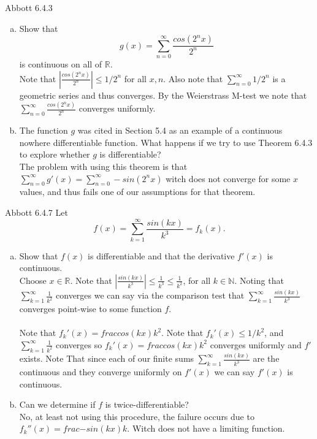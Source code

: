 \documentclass[12pt]{article}
\makeatletter
\theoremstyle{homework}
\newenvironment{exercise}[1]
{\def\@currentlabel{#1}\exercisecore}
{\endexercisecore}
\newcommand{\Reals}{\ensuremath{\mathbb R}}
\let\RR\Reals
\makeatother
\begin{document}
\begin{exercise}
3
Abbott 6.4.3
\end{exercise}
\begin{enumerate}[(a)]
\item
Show that $$g(x) = \sum_{n=0}^\infty \frac{cos(2^n x)}{2^n}$$ is continuous on all of $\RR$.\\
Note that $|\frac{cos(2^n x)}{2^n}|\leq 1/2^n$ for all $x,n$.  Also note that $\sum_{n=0}^\infty 1/2^n$ is a geometric series and thus converges.  By the Weierstrass M-test we note that $\sum_{n=0}^\infty \frac{cos(2^n x)}{2^n}$ converges uniformly.
\item
The function $g$ was cited in Section 5.4 as an example of a continuous nowhere differentiable function. What happens if we try to use Theorem 6.4.3 to explore whether $g$ is differentiable?\\
The problem with using this theorem is that $\sum_{n=0}^\infty g'(x)=\sum_{n=0}^\infty -sin(2^n x)$ witch does not converge for some $x$ values, and thus fails one of our assumptions for that theorem.
\end{enumerate}
\begin{exercise}
4
Abbott 6.4.7
\end{exercise}
Let $$f(x) = \sum_{k=1}^\infty \frac{sin(kx)}{k^3}=f_k(x).$$
\begin{enumerate}[(a)]
\item
Show that $f(x)$ is differentiable and that the derivative $f'(x)$ is continuous.\\
Choose $x\in\RR$.  Note that $|\frac{sin(kx)}{k^3}|\leq  \frac{1}{k^3}\leq \frac{1}{k^2}$, for all $k\in\mathbb{N}$.  Noting that $\sum_{k=1}^\infty \frac{1}{k^2}$ converges we can say via the comparison test that $\sum_{k=1}^\infty \frac{sin(kx)}{k^3}$ converges point-wise to some function $f$.\\\\
Note that $f_k'(x)=frac{cos(kx)}{k^2}$.  Note that $f_k'(x)\leq 1/k^2$, and $\sum_{k=1}^\infty \frac{1}{k^2}$ converges so $f_k'(x)=frac{cos(kx)}{k^2}$ converges uniformly and $f'$ exists.  Note That since each of our finite sums $\sum_{k=1}^\infty \frac{sin(kx)}{k^3}$ are the continuous and they converge uniformly on $f'(x)$ we can say $f'(x)$ is continuous.
\item
Can we determine if $f$ is twice-differentiable?\\
No, at least not using this procedure, the failure occurs due to $f_k''(x)=frac{-sin(kx)}{k}$.  Witch does not have a limiting function.
\end{enumerate}
\end{document}
